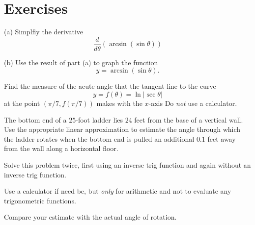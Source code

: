 \documentclass{ximera}
\begin{document}
\section*{Exercises}

\begin{question}  \label{Qfdgtnn}
(a) Simplfiy the derivative
\[
     \frac{d}{d\theta}\left(  \arcsin(\sin \theta) \right)
\]

(b) Use the result of part (a) to graph the function
\[
        y = \arcsin (\sin\theta) .
\] 
\end{question}

\begin{question} \label{QWcsdefv3e354}
Find the measure of the acute angle that the tangent line to the curve
\[
      y = f(\theta) = \ln |\sec\theta|
\]
at the point $(\pi/7, f(\pi/7))$ makes with the $x$-axis Do \emph{not} use a calculator.
\end{question}

\begin{question}  \label{Q:3e4fg45534}
The bottom end of a $25$-foot ladder lies $24$ feet from the base of a vertical wall. Use the appropriate linear approximation to estimate the angle through which the ladder rotates when the bottom end is pulled an additional $0.1$ feet away from the wall along a horizontal floor. 

Solve this problem twice, first using an inverse trig function and again without an inverse trig function. 

Use a calculator if need be, but \emph{only} for arithmetic and not to evaluate any trigonometric functions.

Compare your estimate with the actual angle of rotation.


\end{question}
\end{document}
